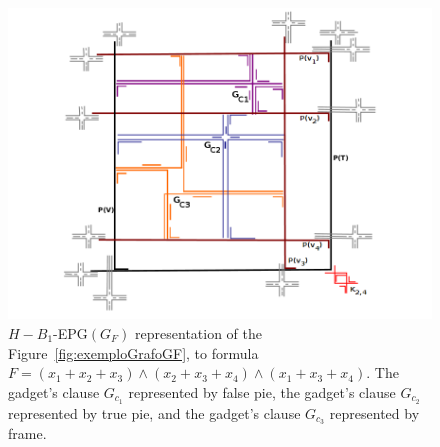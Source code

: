 \begin{figure}[htb]	
\center%
\includegraphics[width=1\textwidth]{./img/formulaGFCompletaSBPO3diferentes2.png}
\caption{$H-B_{1}$-EPG$(G_{F})$ representation of the Figure~\ref{fig:exemploGrafoGF}, to formula $F=(x_1+ x_2+ x_3) \wedge  (x_2+ x_3+ x_4 )\wedge  (x_1+ x_3+ x_4 )$. The gadget's clause $G_{c_1}$ represented by false pie, the gadget's clause $G_{c_2}$ represented by true pie, and the gadget's clause $G_{c_3}$ represented by frame.}
\label{fig:grafoFormula}
\end{figure}
